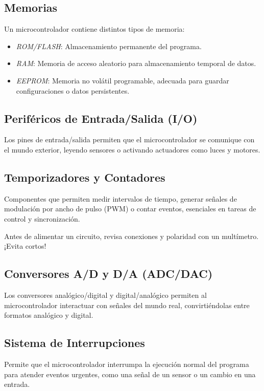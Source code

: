 \documentclass[a4paper,11pt]{article}
\begin{document}
\subsection{Memorias}
Un microcontrolador contiene distintos tipos de memoria:
\begin{itemize}
  \item \textit{ROM/FLASH}: Almacenamiento permanente del programa.
  \item \textit{RAM}: Memoria de acceso aleatorio para almacenamiento temporal de datos.
  \item \textit{EEPROM}: Memoria no vol\'atil programable, adecuada para guardar configuraciones o datos persistentes.
\end{itemize}

\subsection{Perif\'ericos de Entrada/Salida (I/O)}
Los pines de entrada/salida permiten que el microcontrolador se comunique con el mundo exterior, leyendo sensores o activando actuadores como luces y motores.

\subsection{Temporizadores y Contadores}
Componentes que permiten medir intervalos de tiempo, generar se\~nales de modulación por ancho de pulso (PWM) o contar eventos, esenciales en tareas de control y sincronizaci\'on.

\begin{tcolorbox}[tip,title=Tip rápido]
Antes de alimentar un circuito, revisa conexiones y polaridad con un multímetro. ¡Evita cortos!
\end{tcolorbox}

\subsection{Conversores A/D y D/A (ADC/DAC)}
Los conversores anal\'ogico/digital y digital/anal\'ogico permiten al microcontrolador interactuar con se\~nales del mundo real, convirti\'endolas entre formatos anal\'ogico y digital.

\subsection{Sistema de Interrupciones}
Permite que el microcontrolador interrumpa la ejecuci\'on normal del programa para atender eventos urgentes, como una se\~nal de un sensor o un cambio en una entrada.
\end{document}
